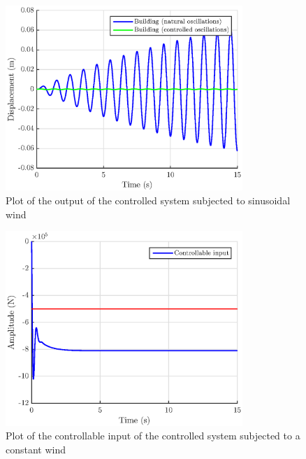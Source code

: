 \begin{figure}[H]
    \centering
    \includegraphics[width=0.8\textwidth]{resources/eps/4-Val/sin_building.eps}
    \caption{Plot of the output of the controlled system subjected to sinusoidal wind}
    \label{fig:output}
\end{figure}
\begin{figure}[H]
    \centering
    \includegraphics[width=0.8\textwidth]{resources/eps/4-Val/cst_force.eps}
    \caption{Plot of the controllable input of the controlled system subjected to a constant wind}
    \label{fig:controllable-input2}
\end{figure}

